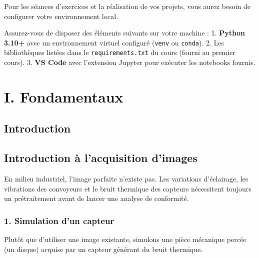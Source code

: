 \documentclass[
  letterpaper,
  DIV=11,
  numbers=noendperiod]{scrreprt}
\begin{document}

Pour les séances d'exercices et la réalisation de vos projets, vous
aurez besoin de configurer votre environnement local.

\begin{tcolorbox}[enhanced jigsaw, arc=.35mm, bottomrule=.15mm, bottomtitle=1mm, breakable, colback=white, colbacktitle=quarto-callout-note-color!10!white, colframe=quarto-callout-note-color-frame, coltitle=black, left=2mm, leftrule=.75mm, opacityback=0, opacitybacktitle=0.6, rightrule=.15mm, title=\textcolor{quarto-callout-note-color}{\faInfo}\hspace{0.5em}{Prérequis d'installation}, titlerule=0mm, toprule=.15mm, toptitle=1mm]

Assurez-vous de disposer des éléments suivants sur votre machine : 1.
\textbf{Python 3.10+} avec un environnement virtuel configuré
(\texttt{venv} ou \texttt{conda}). 2. Les bibliothèques listées dans le
\texttt{requirements.txt} du cours (fourni au premier cours). 3.
\textbf{VS Code} avec l'extension Jupyter pour exécuter les notebooks
fournis.

\end{tcolorbox}

\part{I. Fondamentaux}

\chapter{Introduction}\label{introduction}

\chapter{Introduction à l'acquisition
d'images}\label{introduction-uxe0-lacquisition-dimages}

En milieu industriel, l'image parfaite n'existe pas. Les variations
d'éclairage, les vibrations des convoyeurs et le bruit thermique des
capteurs nécessitent toujours un prétraitement avant de lancer une
analyse de conformité.

\section{1. Simulation d'un capteur}\label{simulation-dun-capteur}

Plutôt que d'utiliser une image existante, simulons une pièce mécanique
percée (un disque) acquise par un capteur générant du bruit thermique.
\end{document}
